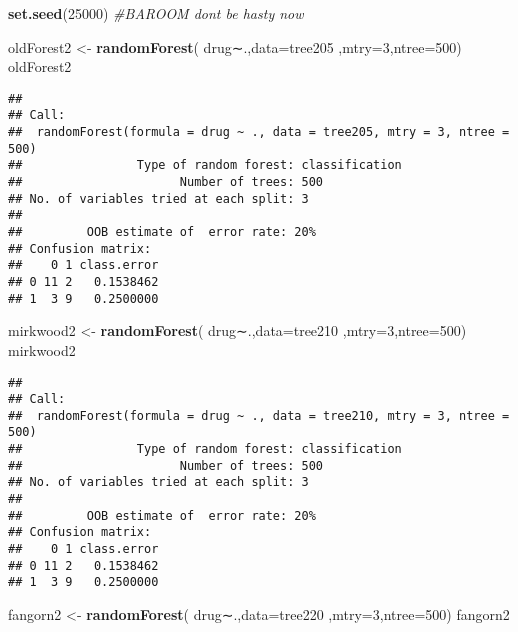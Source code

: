 \documentclass[]{article}
\newenvironment{Shaded}{\begin{snugshade}}{\end{snugshade}}
\newcommand{\KeywordTok}[1]{\textcolor[rgb]{0.13,0.29,0.53}{\textbf{#1}}}
\newcommand{\DataTypeTok}[1]{\textcolor[rgb]{0.13,0.29,0.53}{#1}}
\newcommand{\DecValTok}[1]{\textcolor[rgb]{0.00,0.00,0.81}{#1}}
\newcommand{\StringTok}[1]{\textcolor[rgb]{0.31,0.60,0.02}{#1}}
\newcommand{\CommentTok}[1]{\textcolor[rgb]{0.56,0.35,0.01}{\textit{#1}}}
\newcommand{\NormalTok}[1]{#1}
\begin{document}
\begin{Shaded}
\begin{Highlighting}[]
\KeywordTok{set.seed}\NormalTok{(}\DecValTok{25000}\NormalTok{)}
\CommentTok{#BAROOM dont be hasty now}

\NormalTok{oldForest2 <-}\StringTok{ }\KeywordTok{randomForest}\NormalTok{( drug∼.,}\DataTypeTok{data=}\NormalTok{tree205  ,}\DataTypeTok{mtry=}\DecValTok{3}\NormalTok{,}\DataTypeTok{ntree=}\DecValTok{500}\NormalTok{)}
\NormalTok{oldForest2}
\end{Highlighting}
\end{Shaded}

\begin{verbatim}
## 
## Call:
##  randomForest(formula = drug ~ ., data = tree205, mtry = 3, ntree = 500) 
##                Type of random forest: classification
##                      Number of trees: 500
## No. of variables tried at each split: 3
## 
##         OOB estimate of  error rate: 20%
## Confusion matrix:
##    0 1 class.error
## 0 11 2   0.1538462
## 1  3 9   0.2500000
\end{verbatim}

\begin{Shaded}
\begin{Highlighting}[]
\NormalTok{mirkwood2 <-}\StringTok{ }\KeywordTok{randomForest}\NormalTok{( drug∼.,}\DataTypeTok{data=}\NormalTok{tree210  ,}\DataTypeTok{mtry=}\DecValTok{3}\NormalTok{,}\DataTypeTok{ntree=}\DecValTok{500}\NormalTok{)}
\NormalTok{mirkwood2}
\end{Highlighting}
\end{Shaded}

\begin{verbatim}
## 
## Call:
##  randomForest(formula = drug ~ ., data = tree210, mtry = 3, ntree = 500) 
##                Type of random forest: classification
##                      Number of trees: 500
## No. of variables tried at each split: 3
## 
##         OOB estimate of  error rate: 20%
## Confusion matrix:
##    0 1 class.error
## 0 11 2   0.1538462
## 1  3 9   0.2500000
\end{verbatim}

\begin{Shaded}
\begin{Highlighting}[]
\NormalTok{fangorn2 <-}\StringTok{ }\KeywordTok{randomForest}\NormalTok{( drug∼.,}\DataTypeTok{data=}\NormalTok{tree220  ,}\DataTypeTok{mtry=}\DecValTok{3}\NormalTok{,}\DataTypeTok{ntree=}\DecValTok{500}\NormalTok{)}
\NormalTok{fangorn2}
\end{Highlighting}
\end{Shaded}
\end{document}
